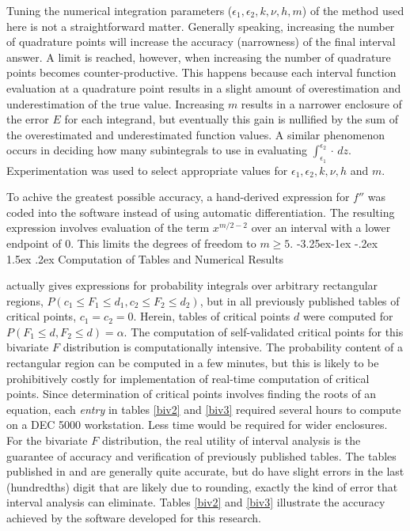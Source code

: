 \documentclass[10pt,letterpaper]{article}
\makeatletter
\renewcommand\subsection{\@startsection{subsection}{2}{\z@}%
                 {-3.25ex\@plus -1ex \@minus -.2ex}%
                 {1.5ex \@plus .2ex}%
                 {\scshape\normalsize\bfseries}} %
\makeatother
\begin{document}
Tuning the numerical integration
parameters ($\epsilon_1, \epsilon_2, k, \nu, h, m$) of the method
used here is not a straightforward matter.  Generally speaking,
increasing the number of quadrature points will increase the accuracy
(narrowness) of the final interval answer.  
A limit is reached, however, when
increasing the number of quadrature points becomes counter-productive.  This
happens because each interval function evaluation at a quadrature point
results in a slight amount of overestimation and underestimation of the true
value.  Increasing $m$ results in a narrower enclosure of the error $E$ for
each integrand, but eventually this gain is nullified by the sum of the
overestimated and underestimated function values.  A similar phenomenon occurs
in deciding how many subintegrals to use in evaluating
$\int_{\epsilon_1}^{\epsilon_2} \cdot\, dz$.  Experimentation was used to
select appropriate values for $\epsilon_1, \epsilon_2, k, \nu, h$ and $m$.
  
To achive the greatest possible accuracy, 
a hand-derived expression for $f''$ was coded into the
software instead of using automatic differentiation.  The
resulting expression involves evaluation of 
the term $x^{m/2-2}$ over an interval with
a lower endpoint of $0$.  This limits the degrees of freedom to
$m \geq 5$.
\subsection{Computation of Tables and Numerical Results}

\cite{Krishnaiah80} actually gives expressions for probability integrals over
arbitrary rectangular regions, 
$P(c_1 \leq F_1 \leq d_1,c_2 \leq F_2 \leq d_2)$,
but in all previously published tables of critical points, $c_1=c_2 = 0$.
Herein, tables of critical points $d$ were computed for 
$P(F_1 \leq d, F_2 \leq d) = \alpha$.
The computation of self-validated critical points for this bivariate $F$
distribution is computationally intensive.  
The probability content of a rectangular
region can be computed in a few minutes, but this is likely to be
prohibitively costly for implementation of real-time computation of critical
points.  Since determination of critical points involves finding the roots of
an equation, each {\it entry}
in tables \ref{biv2} and \ref{biv3} required several hours to compute on a
DEC 5000 workstation.  Less time would be required for wider enclosures.
For the bivariate $F$ distribution, 
the real utility of interval analysis is the guarantee of accuracy and
verification of previously published tables.  The
tables published in \cite{Krishnaiah75} and \cite{Krishnaiah80} are generally
quite accurate, but do have slight errors in the last (hundredths) digit that
are likely due to rounding, exactly the kind of error that interval analysis
can eliminate.  Tables \ref{biv2} and \ref{biv3} illustrate the accuracy
achieved by the software developed for this research.
\end{document}
